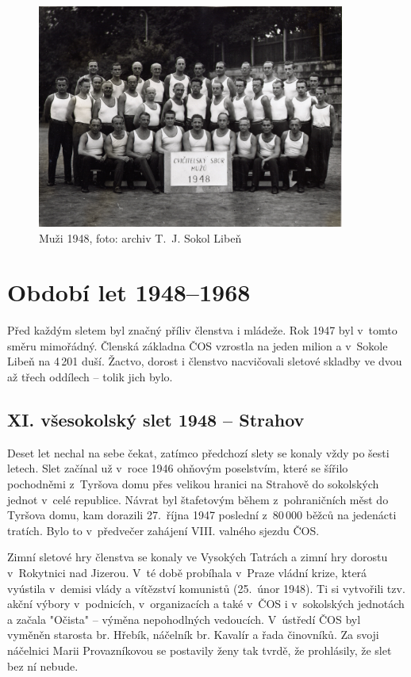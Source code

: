 \documentclass[a5paper, 11pt, twoside]{article}
\begin{document}
\begin{figure}[h!]
  \centering 
  \includegraphics[width=0.9\textwidth]{img/32_muzi_cvicitele.jpg}
  \caption*{Muži 1948, foto: archiv T.~J. Sokol Libeň}
\end{figure}
\vspace{\fill}

\section{Období let 1948--1968}

Před každým sletem byl značný příliv členstva i mládeže. Rok 1947 byl
v~tomto směru mimořádný. Členská základna ČOS vzrostla na jeden milion a
v~Sokole Libeň na 4\,201 duší. Žactvo, dorost i členstvo nacvičovali
sletové skladby ve dvou až třech oddílech -- tolik jich bylo.

\subsection{XI. všesokolský slet 1948 -- Strahov}

Deset let nechal na sebe čekat, zatímco předchozí slety se konaly vždy
po šesti letech. Slet začínal už v~roce 1946 ohňovým poselstvím, které
se šířilo pochodněmi z~Tyršova domu přes velikou hranici na Strahově do
sokolských jednot v~celé republice. Návrat byl štafetovým během
z~pohraničních měst do Tyršova domu, kam dorazili 27.~října 1947 poslední
z~80\,000 běžců na jedenácti tratích. Bylo to v~předvečer zahájení VIII.
valného sjezdu ČOS.

Zimní sletové hry členstva se konaly ve Vysokých Tatrách a zimní hry
dorostu v~Rokytnici nad Jizerou. V~té době probíhala v~Praze vládní
krize, která vyústila v~demisi vlády a vítězství komunistů (25.~únor
1948). Ti si vytvořili tzv. akční výbory v~podnicích, v~organizacích a
také v~ČOS i v~sokolských jednotách a začala "Očista" -- výměna
nepohodlných vedoucích. V~ústředí ČOS byl vyměněn starosta br. Hřebík,
náčelník br. Kavalír a řada činovníků. Za svoji náčelnici Marii
Provazníkovou se postavily ženy tak tvrdě, že prohlásily, že slet bez ní
nebude.
\end{document}
